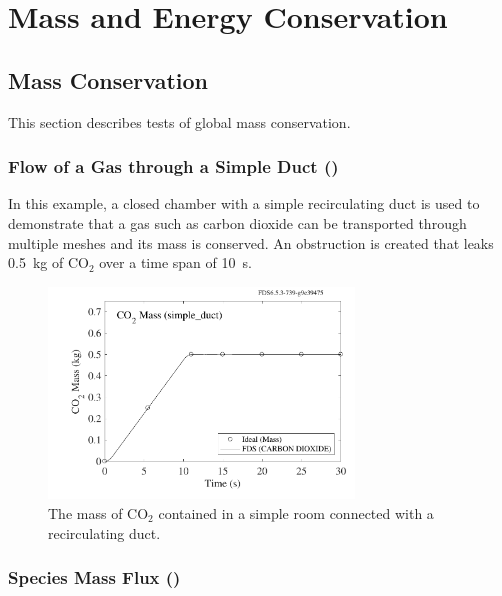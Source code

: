 \documentclass[11pt]{book}
\begin{document}
\chapter{Mass and Energy Conservation}


\section{Mass Conservation}

This section describes tests of global mass conservation.

\subsection{Flow of a Gas through a Simple Duct (\texorpdfstring{}{simple\_duct})}
\label{simple_duct}

In this example, a closed chamber with a simple recirculating duct is used to demonstrate that a gas such as carbon dioxide can be transported
through multiple meshes and its mass is conserved. An obstruction is created that leaks 0.5~kg of CO$_2$ over a time span of 10~s.

\begin{figure}[ht]
\centering
\includegraphics[width=3.2in]{SCRIPT_FIGURES/simple_duct_mass}
\caption[The  test case]{The mass of CO$_2$ contained in a simple room connected with a recirculating duct.}
\label{simple_duct_fig}
\end{figure}


\subsection{Species Mass Flux (\texorpdfstring{}{species\_conservation})}
\label{species_conservation_1}
\label{species_conservation_2}
\label{species_conservation_3}
\label{species_conservation_4}
\end{document}
